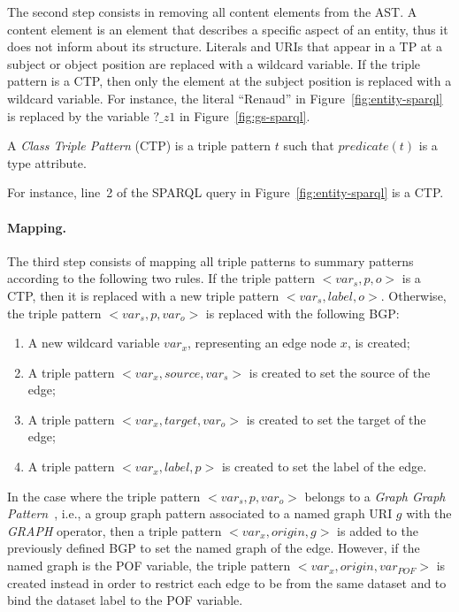 The second step consists in removing all content elements from the AST. A content element is an element that describes a specific aspect of an entity, thus it does not inform about its structure. Literals and URIs that appear in a TP at a subject or object position are replaced with a wildcard variable. If the triple pattern is a CTP, then only the element at the subject position is replaced with a wildcard variable. For instance, the literal ``Renaud'' in Figure~\ref{fig:entity-sparql} is replaced by the variable $?\_z1$ in Figure~\ref{fig:gs-sparql}.

\begin{definition}
	A \emph{Class Triple Pattern} (CTP) is a triple pattern $t$ such that $predicate(t)$ is a type attribute.
	\label{def:class-triple-pattern}
\end{definition}

For instance, line~2 of the SPARQL query in Figure~\ref{fig:entity-sparql} is a CTP.

\paragraph{Mapping.}

The third step consists of mapping all triple patterns to summary patterns according to the following two rules. If the triple pattern $<var_s, p, o>$ is a CTP, then it is replaced with a new triple pattern \mbox{$<var_s, label, o>$}. Otherwise, the triple pattern \mbox{$<var_s, p, var_o>$} is replaced with the following BGP:

\begin{enumerate}
	\item A new wildcard variable $var_x$, representing an edge node $x$, is created;
	\item A triple pattern $<var_x, source, var_s>$ is created to set the source of the edge;
	\item A triple pattern $<var_x, target, var_o>$ is created to set the target of the edge;
	\item A triple pattern $<var_x, label, p>$ is created to set the label of the edge.
\end{enumerate}

In the case where the triple pattern $<var_s, p, var_o>$ belongs to a \emph{Graph Graph Pattern}~\cite{PrudS08}, i.e., a group graph pattern associated to a named graph URI $g$ with the \emph{GRAPH} operator, then a triple pattern $<var_x, origin, g>$ is added to the previously defined BGP to set the named graph of the edge. However, if the named graph is the POF variable, the triple pattern $<var_x, origin, var_{POF}>$ is created instead in order to restrict each edge to be from the same dataset and to bind the dataset label to the POF variable.

